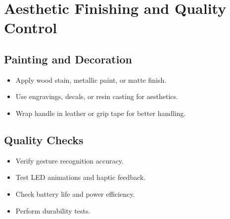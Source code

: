 \section{Aesthetic Finishing and Quality Control}
\subsection{Painting and Decoration}
\begin{itemize}
	\item Apply wood stain, metallic paint, or matte finish.
	\item Use engravings, decals, or resin casting for aesthetics.
	\item Wrap handle in leather or grip tape for better handling.
\end{itemize}

\subsection{Quality Checks}
\begin{itemize}
	\item Verify gesture recognition accuracy.
	\item Test LED animations and haptic feedback.
	\item Check battery life and power efficiency.
	\item Perform durability tests.
\end{itemize}
